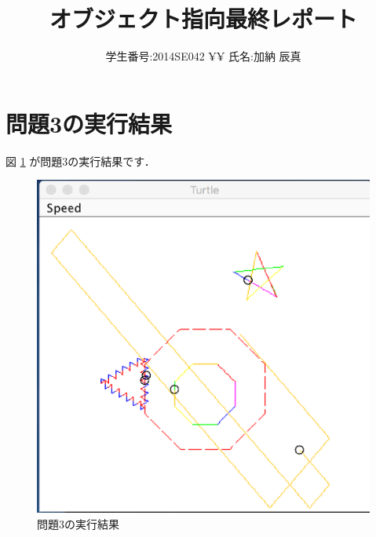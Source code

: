 \documentclass{jarticle}
\title{オブジェクト指向最終レポート}
\author{学生番号:2014SE042 ¥¥ 氏名:加納 辰真}
\begin{document}
\maketitle

\section{問題3の実行結果}
図 \ref{emb} が問題3の実行結果です．

\begin{figure}[h]
  \begin{center}
    \includegraphics{ex3.eps}
    \caption{問題3の実行結果}
    \label{emb}
  \end{center}
\end{figure}
\end{document}
